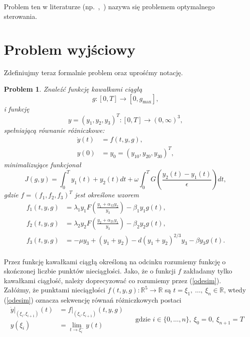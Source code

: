 \documentclass[licencjacka]{pracamgr}
\def\R{\mathbb{R}}
\newtheorem{problem}{Problem}
\begin{document}
Problem ten w literaturze (np.~\cite{diehl},~\cite{rao-methods}) nazywa się problemem optymalnego sterowania.

\section{Problem wyjściowy}
Zdefiniujmy teraz formalnie problem oraz uprośćmy notację.

\begin{problem}\label{problem}
  Znaleźć funkcję kawałkami ciągłą
  \[g: [0, T] \to [0, g_{\max}],\]
  i funkcję
  \[y = {(y_1, y_2, y_3)}^T: [0,T] \to {(0, \infty)}^3,\]
  spełniającą równanie różniczkowe:
  \begin{equation}\label{odesim}
    \begin{aligned}
      \dot{y}(t) &= f(t, y, g), \\
      y(0) &= y_0 = {(y_{10}, y_{20}, y_{30})}^T,
    \end{aligned}
  \end{equation}
  minimalizujące funkcjonał
  \begin{equation}\label{objfsim}
    J(g, y) = \int_0^T y_1(t) + y_2(t)dt + \omega\int_0^T G\left(\frac{y_2(t) - y_1(t)}{\epsilon}\right) dt,
  \end{equation}
  gdzie $f = {(f_1, f_2, f_3)}^T$ jest określone wzorem
  \begin{equation}\label{dynamicsim}
    \begin{aligned}
      f_1(t, y, g) &= \lambda_1y_1F\left(\frac{y_1 + \alpha_{12}y_2}{y_3}\right) - \beta_1y_1g(t), \\
      f_2(t, y, g) &= \lambda_2y_2F\left(\frac{y_2 + \alpha_{21}y_1}{y_3}\right) - \beta_2y_2g(t), \\
      f_3(t, y, g) &= -\mu y_3 + (y_1+y_2) - d{(y_1 + y_2)}^{2/3}y_3 - \beta y_3 g(t). \\
    \end{aligned}
  \end{equation}
\end{problem}

Przez funkcję kawałkami ciągłą określoną na odcinku rozumiemy funkcję o skończonej liczbie punktów nieciągłości. Jako, że o funkcji $f$ zakładamy tylko kawałkami ciągłość, należy doprecyzować co rozumiemy przez (\ref{odesim}). Załóżmy, że punktami nieciągłości $f(t,y,g): \R^5 \to \R$ są $t = \xi_1,\ \ldots,\ \xi_n \in \R$, wtedy (\ref{odesim}) oznacza sekwencję równań różniczkowych postaci
\begin{equation}\label{nonconode}
  \begin{aligned}
    \dot{y}|_{(\xi_i, \xi_{i+1})}(t) &= f|_{(\xi_i, \xi_{i+1})}(t, y, g)\\
    y(\xi_i) &= \lim_{t\to \xi_i^-}y(t)
  \end{aligned}
  \quad \text{ gdzie } i \in \{0,\ldots, n\},\ \xi_0 = 0,\ \xi_{n+1}=T
\end{equation}
\end{document}
